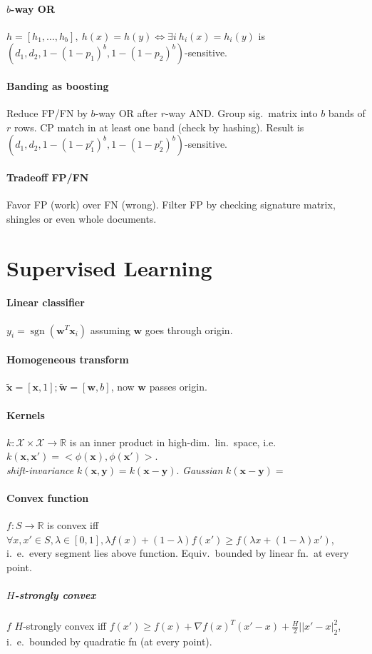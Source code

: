 \documentclass[9pt]{scrartcl}
\DeclareMathOperator{\sign}{sgn}
\newcommand{\R}{\mathbb{R}}
\begin{document}
\begin{twocolumn}
\paragraph{$b$-way OR}
$h = [h_1,\dots,h_b],\ h(x) = h(y) \Leftrightarrow \exists i\ h_i(x) = h_i(y)$ is $(d_1,d_2,1-(1-p_1)^b,1-(1-p_2)^b)$-sensitive.

\paragraph{Banding as boosting}
Reduce FP/FN by $b$-way OR after $r$-way AND.
Group sig.\ matrix into $b$ bands of $r$ rows.
CP match in at least one band (check by hashing).
Result is $(d_1,d_2,1-(1-p_1^r)^b,1-(1-p_2^r)^b)$-sensitive.

\paragraph{Tradeoff FP/FN}
Favor FP (work) over FN (wrong).
Filter FP by checking signature matrix, shingles or even whole documents.


\section{Supervised Learning}
\paragraph{Linear classifier} $y_i = \sign(\bm w^T\bm x_i)$ assuming $\bm w$ goes through origin.
\paragraph{Homogeneous transform} $\tilde{\bm x} = [\bm x, 1]; \tilde{\bm w} = [\bm w, b]$, now $\bm w$ passes origin.
\paragraph{Kernels}
$k: \mathcal{X}\times\mathcal{X} \rightarrow \R$ is an inner product in high-dim.\ lin.\ space, i.e.\ $k(\bm x,\bm x') = <\phi(\bm x),\phi(\bm x')>$.\\
\emph{shift-invariance} $k(\bm x,\bm y) = k(\bm x - \bm y)$.
\emph{Gaussian} $k(\bm x - \bm y) = $

\paragraph{Convex function} $f: S \rightarrow \R$ is convex iff $\forall x,x'\in S, \lambda \in [0,1], \lambda f(x) + (1-\lambda)f(x') \geq f(\lambda x + (1-\lambda)x')$, i.\ e.\ every segment lies above function. Equiv.\ bounded by linear fn.\ at every point.
\subparagraph{$H$-strongly convex} $f$ $H$-strongly convex iff $f(x') \geq f(x) + \nabla f(x)^T(x'-x)+\frac{H}{2}||x'-x|_2^2$, i.\ e.\ bounded by quadratic fn (at every point).

\end{twocolumn}
\end{document}
